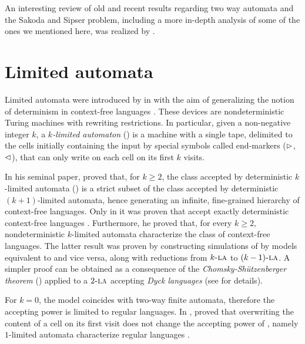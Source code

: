 An interesting review of old and recent results regarding two way automata and the Sakoda and Sipser problem, including a more in-depth analysis of some of the ones we mentioned here, was realized by .


\section{Limited automata}
Limited automata were introduced by  in \citeyear{Hib67} with the aim of generalizing the notion of determinism in context-free languages \cite{Hib67}.
These devices are nondeterministic Turing machines with rewriting restrictions.
In particular, given a non-negative integer $k$, a \emph{$k$-limited automaton} (\kLA) is a machine with a single tape, delimited to the cells initially containing the input by special symbols called end-markers ($\rhd$,$\lhd$), that can only write on each cell on its first $k$ visits.

In his seminal paper, \citeauthor{Hib67} proved that, for $k\ge2$, the class accepted by deterministic $k$-limited automata (\kDLA) is a strict subset of the class accepted by deterministic $(k+1)$-limited automata, hence generating an infinite, fine-grained hierarchy of context-free languages.
Only in \citeyear{PigPis15} it was proven that  accept exactly deterministic context-free languages \cite{PigPis15}.
Furthermore, he proved that, for every $k\ge2$, nondeterministic $k$-limited automata characterize the class of context-free languages.
The latter result was proven by constructing simulations of  by models equivalent to \PDAs and vice versa, along with reductions from $k\textsc{-la}$ to $(k-1)\textsc{-la}$.
A simpler proof can be obtained as a consequence of the \emph{Chomsky-Shützenberger theorem} (\cite{ChoSch63}) applied to a $2\textsc{-la}$ accepting \emph{Dyck languages} (see \cite{Pig19} for details).

For $k=0$, the model coincides with two-way finite automata, therefore the accepting power is limited to regular languages.
In \citeyear{WagWec86}, \citeauthor{WagWec86} proved that overwriting the content of a cell on its first visit does not change the accepting power of \TNFAs, namely $1$-limited automata characterize regular languages \cite{WagWec86}.

